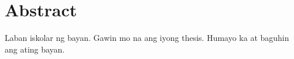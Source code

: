 \chapter*{Abstract}
Laban iskolar ng bayan. Gawin mo na ang iyong thesis. Humayo ka at baguhin ang ating bayan.

